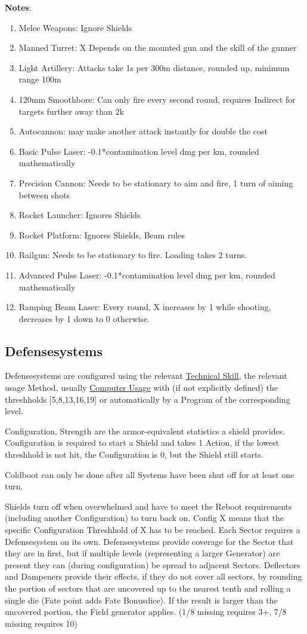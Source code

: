 \textbf{Notes}:
\begin{enumerate}[label = - ]
\item Melee Weapons: Ignore Shields
\item Manned Turret: X Depends on the mounted gun and the skill of the gunner
\item Light Artillery: Attacks take 1s per 300m distance, rounded up, minimum range 100m
\item 120mm Smoothbore: Can only fire every second round, requires Indirect for targets further away than 2k
\item Autocannon: may make another attack instantly for double the cost
\item Basic Pulse Laser: -0.1*contamination level dmg per km, rounded mathematically
\item Precision Cannon: Needs to be stationary to aim and fire, 1 turn of aiming between shots
\item Rocket Launcher: Ignores Shields
\item Rocket Platform: Ignores Shields, Beam rules
\item Railgun: Needs to be stationary to fire.
Loading takes 2 turns.
\item Advanced Pulse Laser: -0.1*contamination level dmg per km, rounded mathematically
\item Ramping Beam Laser: Every round, X increases by 1 while shooting, decreases by 1 down to 0 otherwise.
\end{enumerate}


\subsection{Defensesystems}\label{subsec:defensesystems}
Defensesystems are configured using the relevant \hyperref[subsubsec:defense]{Technical Skill},
the relevant usage Method, usually \hyperref[subsec:computer]{Computer Usage}
with (if not explicitly defined) the threshholds [5,8,13,16,19] or automatically by a Program of the corresponding level.


Configuration, Strength are the  armor-equivalent statistics a shield provides.
Configuration is required to start a Shield and takes 1 Action, if the lowest threshhold is not hit, the Configuration
is 0, but the Shield still starts.

Coldboot can only be done after all Systems have been shut off for at least one turn.

Shields turn off when overwhelmed and have to meet the Reboot requirements (including another Configuration) to turn
back on.
Config X means that the specific Configuration Threshhold of X has to be reached.
Each Sector requires a Defensesystem on its own.
Defensesystems provide coverage for the Sector that they are in first, but if multiple levels (representing a larger
Generator) are present they can (during configuration) be spread to adjacent Sectors.
Deflectors and Dampeners provide their effects, if they do not cover all sectors, by rounding the portion of sectors
that are uncovered up to the nearest tenth and rolling a single die (Fate point adds Fate Bonusdice).
If the result is larger than the uncovered portion, the Field generator applies.
(1/8 missing requires 3+, 7/8 missing requires 10)


